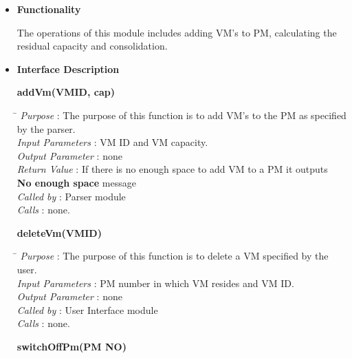\documentclass[a4paper,11pt]{article}
\begin{document}
\begin{itemize}
\item \textbf{Functionality}

The operations of this module includes adding VM's to PM, calculating the residual capacity and consolidation.

\item \textbf{Interface Description}


\textbf{addVm(VM\textunderscore ID, cap)}
  
\begin{tabbing}
\hspace*{4cm}\= \kill
 \textit{Purpose} \> : The purpose of this function is to add VM's to the PM as specified\\ \> by the parser.\\
  \textit{Input Parameters} \> : VM ID and VM capacity. \\
  \textit{Output Parameter} \> : none \\
  \textit{Return Value} \> : If there is no enough space to add VM to a PM it outputs \\ \>\textbf{No enough space} message\\
  \textit{Called by} \> : Parser module \\
  \textit{Calls} \> : none.\\
\end{tabbing}

\textbf{deleteVm(VM\textunderscore ID)}
  
\begin{tabbing}
\hspace*{4cm}\= \kill
 \textit{Purpose} \> : The purpose of this function is to delete a VM specified by the user.\\
  \textit{Input Parameters} \> : PM number in which VM resides and VM ID. \\
  \textit{Output Parameter} \> : none \\
 \textit{Called by} \> : User Interface module \\
  \textit{Calls} \> : none.\\
\end{tabbing}
\pagebreak
\textbf{switchOffPm(PM \textunderscore NO)}
  

\end{itemize}
\end{document}
